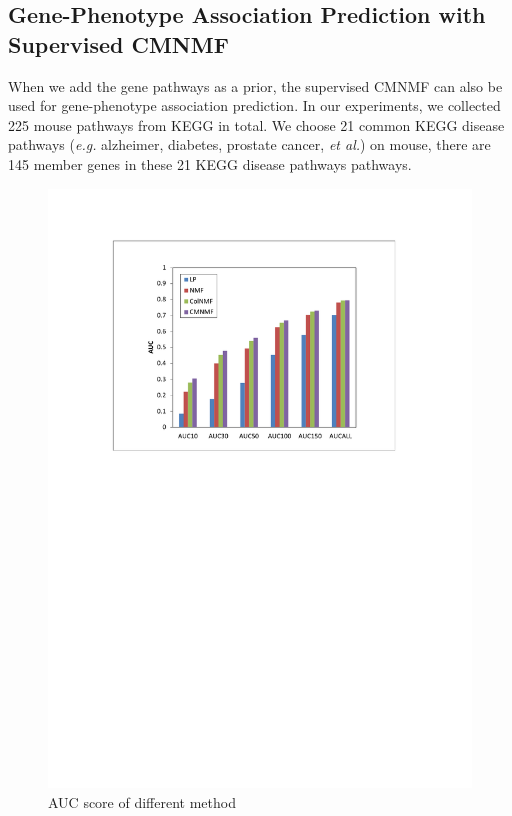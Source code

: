 \documentclass{bmcart}
\begin{document}
\subsection*{\textbf{Gene-Phenotype Association Prediction with Supervised CMNMF}}
When we add the gene pathways as a prior, the supervised CMNMF can also be used for gene-phenotype association prediction. In our experiments, we collected 225 mouse pathways from KEGG in total. We choose 21 common KEGG disease pathways (\emph{e.g.} alzheimer, diabetes, prostate cancer, \emph{et al.}) on mouse, there are 145 member genes in these 21 KEGG disease pathways pathways.
\begin{figure}[!h]
  \begin{minipage}[t]{0.9\linewidth}
    \includegraphics[width=\linewidth,origin = l]{DrawPictures/auc_excel.pdf}
  \end{minipage}
  \caption{AUC score of different method} \label{fig:AUC}
\end{figure}
\end{document}
